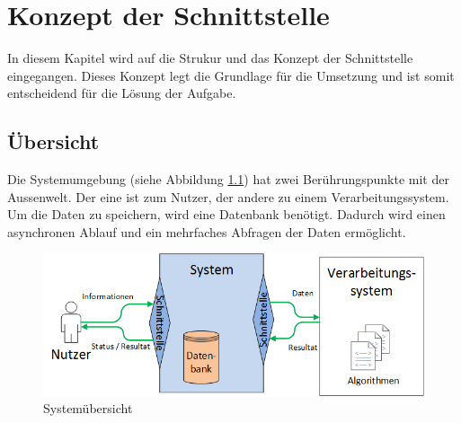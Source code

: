 %
%

\chapter{Konzept der Schnittstelle \resultAssignment{[R4]}}\label{chap.architektur}
In diesem Kapitel wird auf die Strukur und das Konzept der Schnittstelle eingegangen. Dieses Konzept legt die Grundlage für die Umsetzung und ist somit entscheidend für die Lösung der 
Aufgabe.

\section{Übersicht}\label{architektur_uebersicht}
Die Systemumgebung (siehe Abbildung \ref{fig:system_scope}) hat zwei Berührungspunkte mit der Aussenwelt. Der eine ist zum Nutzer, der andere zu einem Verarbeitungssystem. 
Um die Daten zu speichern, wird eine Datenbank benötigt. Dadurch wird einen asynchronen Ablauf und ein mehrfaches Abfragen der Daten ermöglicht.
\begin{figure}[h]
\centering
\includegraphics[scale=0.8]{images/visio/Systemscope.png}
\caption[Systemübersicht]{Systemübersicht \selfmade{}}
\label{fig:system_scope}
\end{figure}

